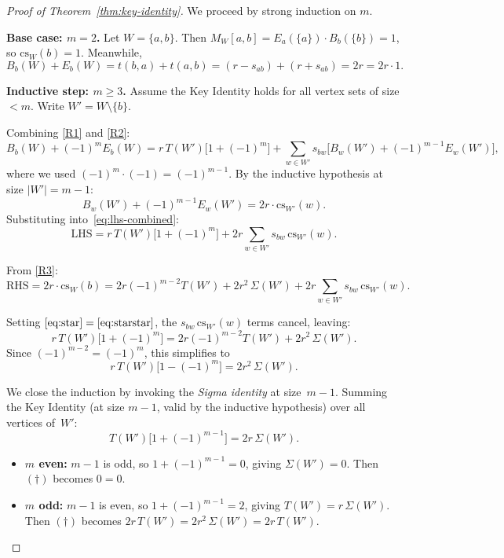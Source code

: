 \begin{proof}[Proof of Theorem~\ref{thm:key-identity}]
We proceed by strong induction on $m$.

\medskip
\noindent\textbf{Base case: $m = 2$.}\;
Let $W = \{a,b\}$.  Then $M_W[a,b] = E_a(\{a\}) \cdot B_b(\{b\}) = 1$,
so $\mathrm{cs}_W(b) = 1$.  Meanwhile,
\[
  B_b(W) + E_b(W) = t(b,a) + t(a,b) = (r - s_{ab}) + (r + s_{ab}) = 2r
  = 2r \cdot 1.
\]

\medskip
\noindent\textbf{Inductive step: $m \geq 3$.}\;
Assume the Key Identity holds for all vertex sets of size $< m$.
Write $W' = W \setminus \{b\}$.

Combining \ref{R1} and \ref{R2}:
\begin{equation}\label{eq:lhs-combined}
  B_b(W) + (-1)^m E_b(W)
  = r\, T(W')\bigl[1 + (-1)^m\bigr]
    + \sum_{w \in W'} s_{bw}\bigl[B_w(W') + (-1)^{m-1} E_w(W')\bigr],
\end{equation}
where we used $(-1)^m \cdot (-1) = (-1)^{m-1}$.
By the inductive hypothesis at size $|W'| = m-1$:
\[
  B_w(W') + (-1)^{m-1} E_w(W') = 2r \cdot \mathrm{cs}_{W'}(w).
\]
Substituting into~\eqref{eq:lhs-combined}:
\begin{equation}\label{eq:star}
  \text{LHS} = r\, T(W')\bigl[1 + (-1)^m\bigr]
    + 2r \sum_{w \in W'} s_{bw}\, \mathrm{cs}_{W'}(w).
    \tag{$*$}
\end{equation}

From \ref{R3}:
\begin{equation}\label{eq:starstar}
  \text{RHS} = 2r \cdot \mathrm{cs}_W(b)
    = 2r(-1)^{m-2} T(W') + 2r^2\, \Sigma(W')
    + 2r \sum_{w \in W'} s_{bw}\, \mathrm{cs}_{W'}(w).
    \tag{$**$}
\end{equation}

Setting $\eqref{eq:star} = \eqref{eq:starstar}$, the
$s_{bw}\, \mathrm{cs}_{W'}(w)$ terms cancel, leaving:
\begin{equation}\label{eq:dagger}
  r\, T(W')\bigl[1 + (-1)^m\bigr]
  = 2r(-1)^{m-2} T(W') + 2r^2\, \Sigma(W').
  \tag{$\dagger$}
\end{equation}
Since $(-1)^{m-2} = (-1)^m$, this simplifies to
\[
  r\, T(W')\bigl[1 - (-1)^m\bigr] = 2r^2\, \Sigma(W').
\]

We close the induction by invoking the \emph{Sigma identity} at size~$m-1$.
Summing the Key Identity (at size $m-1$, valid by the inductive hypothesis)
over all vertices of~$W'$:
\[
  T(W')\bigl[1 + (-1)^{m-1}\bigr] = 2r\, \Sigma(W').
\]

\begin{itemize}[leftmargin=2em]
  \item \textbf{$m$ even:}
    $m - 1$ is odd, so $1 + (-1)^{m-1} = 0$, giving $\Sigma(W') = 0$.
    Then $(\dagger)$ becomes $0 = 0$.\;\checkmark

  \item \textbf{$m$ odd:}
    $m - 1$ is even, so $1 + (-1)^{m-1} = 2$, giving
    $T(W') = r\, \Sigma(W')$.
    Then $(\dagger)$ becomes $2r\, T(W') = 2r^2\, \Sigma(W') = 2r\, T(W')$.\;\checkmark
    \qedhere
\end{itemize}
\end{proof}

